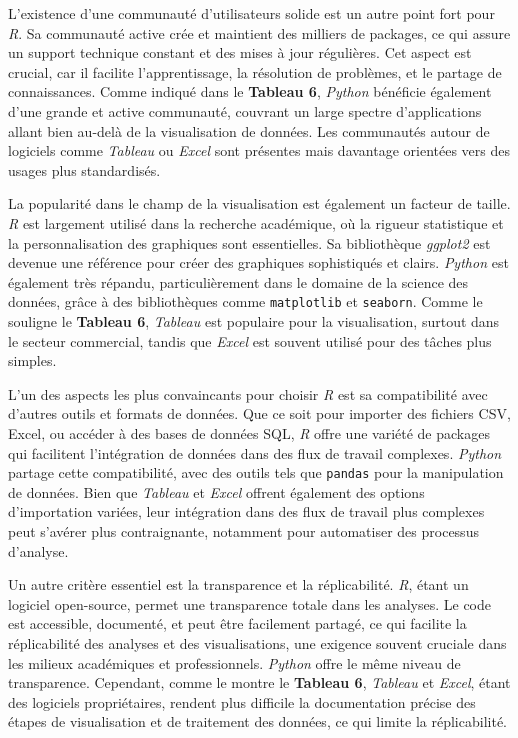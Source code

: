 \documentclass[
  letterpaper,
  DIV=11,
  numbers=noendperiod]{scrreprt}
\begin{document}
L'existence d'une communauté d'utilisateurs solide est un autre point
fort pour \emph{R}. Sa communauté active crée et maintient des milliers
de packages, ce qui assure un support technique constant et des mises à
jour régulières. Cet aspect est crucial, car il facilite
l'apprentissage, la résolution de problèmes, et le partage de
connaissances. Comme indiqué dans le \textbf{Tableau 6}, \emph{Python}
bénéficie également d'une grande et active communauté, couvrant un large
spectre d'applications allant bien au-delà de la visualisation de
données. Les communautés autour de logiciels comme \emph{Tableau} ou
\emph{Excel} sont présentes mais davantage orientées vers des usages
plus standardisés.

La popularité dans le champ de la visualisation est également un facteur
de taille. \emph{R} est largement utilisé dans la recherche académique,
où la rigueur statistique et la personnalisation des graphiques sont
essentielles. Sa bibliothèque \emph{ggplot2} est devenue une référence
pour créer des graphiques sophistiqués et clairs. \emph{Python} est
également très répandu, particulièrement dans le domaine de la science
des données, grâce à des bibliothèques comme \texttt{matplotlib} et
\texttt{seaborn}. Comme le souligne le \textbf{Tableau 6},
\emph{Tableau} est populaire pour la visualisation, surtout dans le
secteur commercial, tandis que \emph{Excel} est souvent utilisé pour des
tâches plus simples.

L'un des aspects les plus convaincants pour choisir \emph{R} est sa
compatibilité avec d'autres outils et formats de données. Que ce soit
pour importer des fichiers CSV, Excel, ou accéder à des bases de données
SQL, \emph{R} offre une variété de packages qui facilitent l'intégration
de données dans des flux de travail complexes. \emph{Python} partage
cette compatibilité, avec des outils tels que \texttt{pandas} pour la
manipulation de données. Bien que \emph{Tableau} et \emph{Excel} offrent
également des options d'importation variées, leur intégration dans des
flux de travail plus complexes peut s'avérer plus contraignante,
notamment pour automatiser des processus d'analyse.

Un autre critère essentiel est la transparence et la réplicabilité.
\emph{R}, étant un logiciel open-source, permet une transparence totale
dans les analyses. Le code est accessible, documenté, et peut être
facilement partagé, ce qui facilite la réplicabilité des analyses et des
visualisations, une exigence souvent cruciale dans les milieux
académiques et professionnels. \emph{Python} offre le même niveau de
transparence. Cependant, comme le montre le \textbf{Tableau 6},
\emph{Tableau} et \emph{Excel}, étant des logiciels propriétaires,
rendent plus difficile la documentation précise des étapes de
visualisation et de traitement des données, ce qui limite la
réplicabilité.
\end{document}
